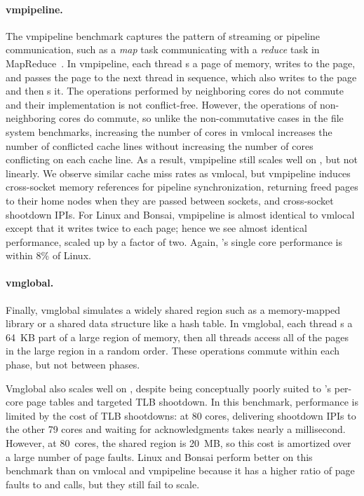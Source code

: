 \paragraph{vmpipeline.} The vmpipeline benchmark captures the pattern
of streaming or pipeline communication, such as a \emph{map} task
communicating with a \emph{reduce} task in
MapReduce~\cite{dean:mapreduce}.
%
In vmpipeline, each thread s a page of memory, writes to
the page, and passes the page to the next thread in sequence, which
also writes to the page and then s it.
%
The operations performed by neighboring cores do not commute and their
implementation is not conflict-free.
%
However, the operations of non-neighboring cores do commute, so unlike
the non-commutative cases in the file system benchmarks, increasing
the number of cores in vmlocal increases the number of conflicted
cache lines without increasing the number of cores conflicting on each
cache line.
%
As a result, vmpipeline still scales well on \sys, but not linearly.
%
We observe similar cache miss rates as vmlocal, but vmpipeline induces
cross-socket memory references for pipeline synchronization, returning
freed pages to their home nodes when they are passed between sockets,
and cross-socket shootdown IPIs.
For Linux and Bonsai, vmpipeline is almost identical to vmlocal except
that it writes twice to each page; hence we see almost identical
performance, scaled up by a factor of two.
%
Again, \sys's single core performance is within 8\% of Linux.


\paragraph{vmglobal.} Finally, vmglobal simulates a widely shared
region such as a memory-mapped library or a shared data structure like
a hash table.
%
In vmglobal, each thread s a 64~KB part of a large region
of memory, then all threads access all of the pages in the large
region in a random order.
%
These operations commute within each phase, but not between phases.

Vmglobal also scales well on \sys, despite being conceptually poorly
suited to \sys's per-core page tables and targeted TLB shootdown.  In
this benchmark, \sys performance is limited by the cost of TLB
shootdowns: at 80 cores, delivering shootdown IPIs to the other 79
cores and waiting for acknowledgments takes nearly a millisecond.
However, at 80~cores, the shared region is 20~MB, so this cost is
amortized over a large number of page faults.
%
Linux and Bonsai perform better on this benchmark than on vmlocal and
vmpipeline because it has a higher ratio of page faults to 
and  calls, but they still fail to scale.


